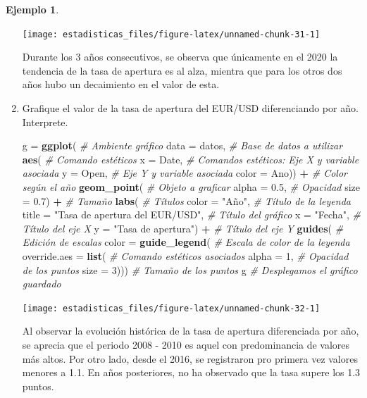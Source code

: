 \documentclass[
  11pt,
]{book}
\newenvironment{Shaded}{\begin{snugshade}}{\end{snugshade}}
\newcommand{\AttributeTok}[1]{\textcolor[rgb]{0.13,0.29,0.53}{#1}}
\newcommand{\CommentTok}[1]{\textcolor[rgb]{0.56,0.35,0.01}{\textit{#1}}}
\newcommand{\DecValTok}[1]{\textcolor[rgb]{0.00,0.00,0.81}{#1}}
\newcommand{\FloatTok}[1]{\textcolor[rgb]{0.00,0.00,0.81}{#1}}
\newcommand{\FunctionTok}[1]{\textcolor[rgb]{0.13,0.29,0.53}{\textbf{#1}}}
\newcommand{\NormalTok}[1]{#1}
\newcommand{\OtherTok}[1]{\textcolor[rgb]{0.56,0.35,0.01}{#1}}
\newcommand{\SpecialCharTok}[1]{\textcolor[rgb]{0.81,0.36,0.00}{\textbf{#1}}}
\newcommand{\StringTok}[1]{\textcolor[rgb]{0.31,0.60,0.02}{#1}}
\theoremstyle{definition}
\theoremstyle{definition}
\newtheorem{example}{Ejemplo}[chapter]
\theoremstyle{definition}
\theoremstyle{definition}
\theoremstyle{remark}
\begin{document}
\begin{example}
\begin{enumerate}
  \begin{center}\texttt{[image: estadisticas\_files/figure-latex/unnamed-chunk-31-1]} \end{center}

  Durante los 3 años consecutivos, se observa que únicamente en el 2020 la tendencia de la tasa de apertura es al alza, mientra que para los otros dos años hubo un decaimiento en el valor de esta.
\item
  Grafique el valor de la tasa de apertura del EUR/USD diferenciando por año. Interprete.

\begin{Shaded}
\begin{Highlighting}[]
\NormalTok{g }\OtherTok{=} \FunctionTok{ggplot}\NormalTok{( }\CommentTok{\# Ambiente gráfico}
  \AttributeTok{data =}\NormalTok{ datos, }\CommentTok{\# Base de datos a utilizar}
  \FunctionTok{aes}\NormalTok{( }\CommentTok{\# Comando estéticos}
\AttributeTok{x =}\NormalTok{ Date, }\CommentTok{\# Comandos estéticos: Eje X y variable asociada}
\AttributeTok{y =}\NormalTok{ Open, }\CommentTok{\# Eje Y y variable asociada}
\AttributeTok{color =}\NormalTok{ Ano)) }\SpecialCharTok{+} \CommentTok{\# Color según el año}
  \FunctionTok{geom\_point}\NormalTok{( }\CommentTok{\# Objeto a graficar}
\AttributeTok{alpha =} \FloatTok{0.5}\NormalTok{, }\CommentTok{\# Opacidad}
\AttributeTok{size =} \FloatTok{0.7}\NormalTok{) }\SpecialCharTok{+} \CommentTok{\# Tamaño}
  \FunctionTok{labs}\NormalTok{( }\CommentTok{\# Títulos}
\AttributeTok{color =} \StringTok{"Año"}\NormalTok{, }\CommentTok{\# Título de la leyenda}
\AttributeTok{title =} \StringTok{"Tasa de apertura del EUR/USD"}\NormalTok{, }\CommentTok{\# Título del gráfico}
\AttributeTok{x =} \StringTok{"Fecha"}\NormalTok{, }\CommentTok{\# Título del eje X}
\AttributeTok{y =} \StringTok{"Tasa de apertura"}\NormalTok{) }\SpecialCharTok{+} \CommentTok{\# Título del eje Y}
  \FunctionTok{guides}\NormalTok{( }\CommentTok{\# Edición de escalas}
\AttributeTok{color =} \FunctionTok{guide\_legend}\NormalTok{( }\CommentTok{\# Escala de color de la leyenda}
  \AttributeTok{override.aes =} \FunctionTok{list}\NormalTok{( }\CommentTok{\# Comando estéticos asociados}
    \AttributeTok{alpha =} \DecValTok{1}\NormalTok{, }\CommentTok{\# Opacidad de los puntos}
    \AttributeTok{size =} \DecValTok{3}\NormalTok{))) }\CommentTok{\# Tamaño de los puntos}
\NormalTok{g }\CommentTok{\# Desplegamos el gráfico guardado}
\end{Highlighting}
\end{Shaded}

  \begin{center}\texttt{[image: estadisticas\_files/figure-latex/unnamed-chunk-32-1]} \end{center}

  Al observar la evolución histórica de la tasa de apertura diferenciada por año, se aprecia que el periodo 2008 - 2010 es aquel con predominancia de valores más altos. Por otro lado, desde el 2016, se registraron pro primera vez valores menores a 1.1. En años posteriores, no ha observado que la tasa supere los 1.3 puntos.
\end{enumerate}

\end{example}
\end{document}
